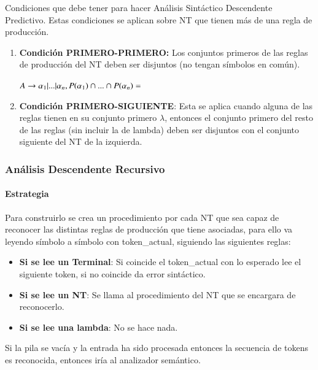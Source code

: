 \documentclass[12pt, twoside, openright]{report} %
\begin{document}
Condiciones que debe tener para hacer Análisis Sintáctico Descendente
Predictivo.
Estas condiciones se aplican sobre NT que tienen más de una regla de
producción.

\begin{enumerate}
\def\labelenumi{\arabic{enumi}.}

\item
  \textbf{Condición PRIMERO-PRIMERO:} Los conjuntos primeros de las
  reglas de producción del NT deben ser disjuntos (no tengan símbolos en
  común).

  \(A \rightarrow \alpha_1 |...|\alpha_n, P(\alpha_1) \cap ... \cap P(\alpha_n) = \empty\)
\item
  \textbf{Condición PRIMERO-SIGUIENTE}: Esta se aplica cuando alguna de
  las reglas tienen en su conjunto primero \(\lambda\), entonces el
  conjunto primero del resto de las reglas (sin incluir la de lambda)
  deben ser disjuntos con el conjunto siguiente del NT de la izquierda.
\end{enumerate}


\subsubsection{Análisis Descendente Recursivo}


\paragraph{Estrategia}

Para construirlo se crea un procedimiento por cada NT que sea capaz de
reconocer las distintas reglas de producción que tiene asociadas, para
ello va leyendo símbolo a símbolo con token\_actual, siguiendo las
siguientes reglas:

\begin{itemize}

\item
\textbf{Si se lee un Terminal}: Si coincide el token\_actual con lo esperado
  lee el siguiente token, si no coincide da error sintáctico.
\item
\textbf{Si se lee un NT}: Se llama al procedimiento del NT que se encargara de
  reconocerlo.
\item
\textbf{Si se lee una lambda}: No se hace nada.
\end{itemize}

Si la pila se vacía y la entrada ha sido procesada entonces la secuencia
de tokens es reconocida, entonces iría al analizador semántico.
\end{document}

